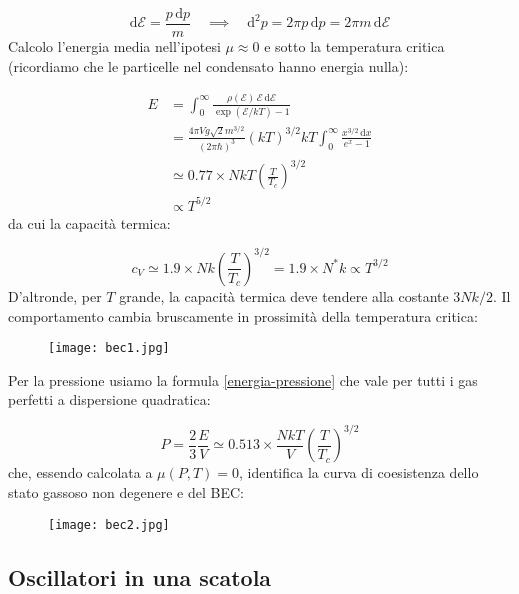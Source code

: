 \documentclass[a4paper]{report}
\begin{document}
\begin{equation}
    \mathrm{d}\mathcal{E} = \frac{p\,\mathrm{d}p}{m} \quad \implies \quad \mathrm{d}^2 p = 2\pi p\,\mathrm{d}p = 2\pi m\, \mathrm{d}\mathcal{E}
\end{equation}
Calcolo l'energia media nell'ipotesi $\mu \approx 0$ e sotto la temperatura critica (ricordiamo che le particelle nel condensato hanno energia nulla):

\begin{equation}
    \begin{split}
        E & = \int_{0}^{\infty} \frac{\rho(\mathcal{E})\,\mathcal{E}\,\mathrm{d}\mathcal{E}}{\exp(\mathcal{E}/k T) -1} \\
        & = \frac{4\pi V g \sqrt 2 m^{3/2}}{(2 \pi \hbar)^3} (k T)^{3/2} k T \int_{0}^{\infty} \frac{x^{3/2}\,\mathrm{d}x} {e^x - 1} \\
        & \simeq 0.77 \times N k T \left(\frac{T}{T_c}\right)^{3/2} \\
        & \propto T^{5/2}
    \end{split}
\end{equation}
da cui la capacità termica:

\begin{equation}
    c_V \simeq 1.9 \times N k \left(\frac{T}{T_c}\right)^{3/2} = 1.9 \times N^{*}k \propto T^{3/2}
\end{equation}
D'altronde, per $T$ grande, la capacità termica deve tendere alla costante $3 N k/2$. Il comportamento cambia bruscamente in prossimità della temperatura critica:

\begin{figure}[h!]
    \centering
    \texttt{[image: bec1.jpg]}
\end{figure}

Per la pressione usiamo la formula \eqref{energia-pressione} che vale per tutti i gas perfetti a dispersione quadratica:

\begin{equation}
    P = \frac{2}{3}\frac{E}{V} \simeq 0.513 \times\frac{N k T}{V}\left(\frac{T}{T_c}\right)^{3/2}
\end{equation}
che, essendo calcolata a $\mu(P,T) = 0$, identifica la curva di coesistenza dello stato gassoso non degenere e del BEC:
\begin{figure}[h!]
    \centering
    \texttt{[image: bec2.jpg]}
\end{figure}

\subsection{Oscillatori in una scatola}
\end{document}
